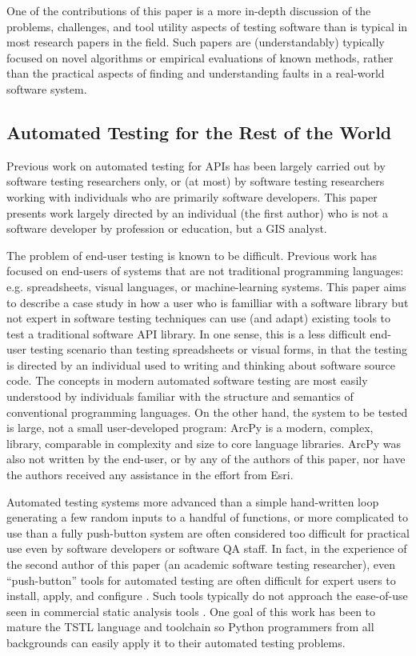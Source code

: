 One of the contributions of this paper is a more in-depth discussion
of the problems, challenges, and tool utility aspects of testing
software than is typical in most research papers in the field.  Such
papers are (understandably) typically focused on novel algorithms or
empirical evaluations of known methods, rather than the practical aspects of finding
and understanding faults in a real-world software system.


\subsection{Automated Testing for the Rest of the World}

Previous work on automated testing for APIs has been largely carried
out by software testing researchers only, or (at most) by software
testing researchers working with individuals who are primarily
software developers.  This paper presents work largely directed by an
individual (the first author) who is not a software developer by
profession or education, but a GIS analyst.  

The problem of end-user testing
\cite{burnettEUSE,Silos,rothermelTOSEM} is known to be difficult.
Previous work has focused on end-users of systems that are not
traditional programming languages: e.g. spreadsheets, visual
languages, or machine-learning systems.  This paper aims to describe a
case study in how a user who is familliar with a software library but
not expert in software testing techniques can use (and adapt) existing
tools to test a traditional software API library.  In one sense, this
is a less difficult end-user testing scenario than testing
spreadsheets or visual forms, in that the testing is directed by an
individual used to writing and thinking about software source code.
The concepts in modern automated software testing are most easily
understood by individuals familiar with the structure and semantics of
conventional programming languages.  On the other hand, the system to
be tested is large, not a small user-developed program: ArcPy is
a modern, complex, library, comparable in complexity and size to
core language libraries.   ArcPy was also not written by the end-user,
or by any of the authors of this paper, nor have the authors received
any  assistance in the effort from Esri.

Automated testing systems more advanced than a simple hand-written loop generating 
a few random inputs to a handful of functions, or more complicated to 
use than a fully push-button system are often considered too difficult 
for practical use even by software developers or software QA staff.
In fact, in the experience of the second author of this paper (an
academic software testing researcher), even ``push-button'' tools for
automated testing are often difficult for expert users to install, apply, and
configure \cite{AMAI,ISSRE}.  Such tools typically do not approach the ease-of-use seen
in commercial static analysis tools \cite{Coverity,Klocwork,CodeSonar}.  One goal of this work
has been to mature the TSTL language and toolchain so Python
programmers from all backgrounds can easily apply it to their
automated testing problems.

